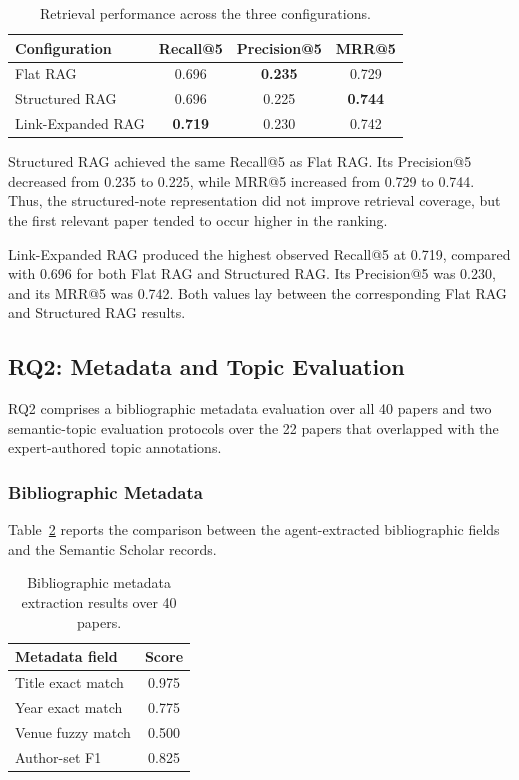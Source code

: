 \documentclass[runningheads]{llncs}
\begin{document}
\begin{table}[!htbp]
\centering
\caption{Retrieval performance across the three configurations.}
\label{tab:rq1_results}
\begin{tabular}{lccc}
\toprule
\textbf{Configuration} & \textbf{Recall@5} & \textbf{Precision@5} & \textbf{MRR@5} \\
\midrule
Flat RAG & 0.696 & \textbf{0.235} & 0.729 \\
Structured RAG & 0.696 & 0.225 & \textbf{0.744} \\
Link-Expanded RAG & \textbf{0.719} & 0.230 & 0.742 \\
\bottomrule
\end{tabular}
\end{table}

Structured RAG achieved the same Recall@5 as Flat RAG. Its Precision@5
decreased from 0.235 to 0.225, while MRR@5 increased from 0.729 to
0.744. Thus, the structured-note representation did not improve
retrieval coverage, but the first relevant paper tended to occur higher
in the ranking.

Link-Expanded RAG produced the highest observed Recall@5 at 0.719,
compared with 0.696 for both Flat RAG and Structured RAG. Its
Precision@5 was 0.230, and its MRR@5 was 0.742. Both values lay between
the corresponding Flat RAG and Structured RAG results.

\subsection{RQ2: Metadata and Topic Evaluation}
\label{sec:rq2_results}

RQ2 comprises a bibliographic metadata evaluation over all 40 papers
and two semantic-topic evaluation protocols over the 22 papers that
overlapped with the expert-authored topic annotations.

\subsubsection{Bibliographic Metadata}

Table~\ref{tab:rq2_group_a} reports the comparison between the
agent-extracted bibliographic fields and the Semantic Scholar records.

\begin{table}[!htbp]
\centering
\caption{Bibliographic metadata extraction results over 40 papers.}
\label{tab:rq2_group_a}
\begin{tabular}{lc}
\toprule
\textbf{Metadata field} & \textbf{Score} \\
\midrule
Title exact match & 0.975 \\
Year exact match & 0.775 \\
Venue fuzzy match & 0.500 \\
Author-set F1 & 0.825 \\
\bottomrule
\end{tabular}
\end{table}
\end{document}
